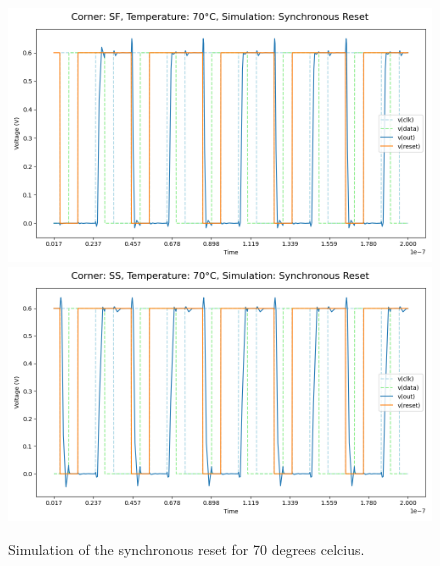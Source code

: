 \begin{figure}[H]
    \vspace{5pt}
    \includegraphics[height= 0.21\textheight]{figures/aimspice/SF/70/W4.csv.png}
    \vspace{5pt}
    \includegraphics[height= 0.21\textheight]{figures/aimspice/SS/70/W4.csv.png}
    \caption{Simulation of the synchronous reset for 70 degrees celcius.}
    \label{fig:aimspice_W4_70}
\end{figure}

\pagebreak

